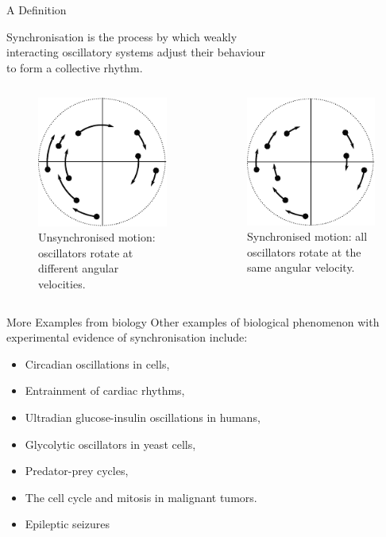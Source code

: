 \documentclass[10pt,reqno]{beamer}
\begin{document}
\begin{frame}{A Definition}

\begin{tcolorbox}[notitle, boxrule=0pt, colback=lred]
\centering
	Synchronisation is the process by which weakly\\ interacting oscillatory systems adjust their behaviour\\ to form a collective rhythm.
\end{tcolorbox}
	\begin{columns}
		\scriptsize
	\begin{column}{0.49\textwidth}
		\begin{figure}
			\includegraphics[scale=0.70]{synch1.pdf}
			\caption{Unsynchronised motion: oscillators rotate at different angular velocities.}
		\end{figure}
	\end{column}
	\begin{column}{0.49\textwidth}
		\begin{figure}
			\includegraphics[scale=0.70]{synch2.pdf}
			\caption{Synchronised motion: all oscillators rotate at the same angular velocity.}
		\end{figure}
	\end{column}
\end{columns}
\end{frame}
\begin{frame}{More Examples from biology}
Other examples of biological phenomenon with experimental evidence of synchronisation include\cite{synch}:
\begin{itemize}
	\item Circadian oscillations in cells,
	\item Entrainment of cardiac rhythms,
	\item Ultradian glucose-insulin oscillations in humans,
	\item Glycolytic oscillators in yeast cells,
	\item Predator-prey cycles,
	\item The cell cycle and mitosis in malignant tumors.
	\item Epileptic seizures
\end{itemize}
\end{frame}
\end{document}
